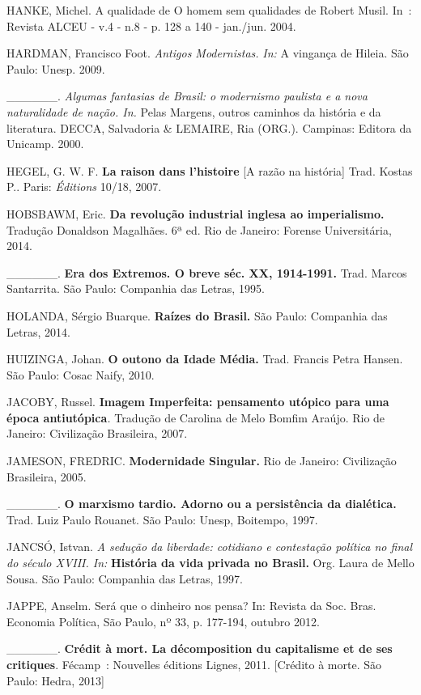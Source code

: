 HANKE, Michel. A qualidade de O homem sem qualidades de Robert Musil.
In~: Revista ALCEU - v.4 - n.8 - p. 128 a 140 - jan./jun. 2004.

HARDMAN, Francisco Foot. \emph{Antigos Modernistas.} \emph{In:} A
vingança de Hileia. São Paulo: Unesp. 2009.

\_\_\_\_\_\_. \emph{Algumas fantasias de Brasil: o modernismo paulista e
a nova naturalidade de nação. In.} Pelas Margens, outros caminhos da
história e da literatura. DECCA, Salvadoria \& LEMAIRE, Ria (ORG.).
Campinas: Editora da Unicamp. 2000.

HEGEL, G. W. F. \textbf{La raison dans l'histoire} {[}A razão na
história{]} Trad. Kostas P.. Paris: \emph{Éditions} 10/18, 2007.

HOBSBAWM, Eric. \textbf{Da revolução industrial inglesa ao
imperialismo.} Tradução Donaldson Magalhães. 6ª ed. Rio de Janeiro:
Forense Universitária, 2014.

\_\_\_\_\_\_. \textbf{Era dos Extremos. O breve séc. XX, 1914-1991.}
Trad. Marcos Santarrita. São Paulo: Companhia das Letras, 1995.

HOLANDA, Sérgio Buarque. \textbf{Raízes do Brasil.} São Paulo: Companhia
das Letras, 2014.

HUIZINGA, Johan. \textbf{O outono da Idade Média.} Trad. Francis Petra
Hansen. São Paulo: Cosac Naify, 2010.

JACOBY, Russel. \textbf{Imagem Imperfeita: pensamento utópico para uma
época antiutópica}\emph{.} Tradução de Carolina de Melo Bomfim Araújo.
Rio de Janeiro: Civilização Brasileira, 2007.

JAMESON, FREDRIC. \textbf{Modernidade Singular.} Rio de Janeiro:
Civilização Brasileira, 2005.

\_\_\_\_\_\_. \textbf{O marxismo tardio. Adorno ou a persistência da
dialética.} Trad. Luiz Paulo Rouanet. São Paulo: Unesp, Boitempo, 1997.

JANCSÓ, Istvan. \emph{A sedução da liberdade: cotidiano e contestação
política no final do século XVIII. In:} \textbf{História da vida privada
no Brasil.} Org. Laura de Mello Sousa. São Paulo: Companhia das Letras,
1997.

JAPPE, Anselm. Será que o dinheiro nos pensa? In: Revista da Soc. Bras.
Economia Política, São Paulo, nº 33, p. 177-194, outubro 2012.

\_\_\_\_\_\_. \textbf{Crédit à mort. La décomposition du capitalisme et
de ses critiques}. Fécamp~: Nouvelles éditions Lignes, 2011. {[}Crédito
à morte. São Paulo: Hedra, 2013{]}

